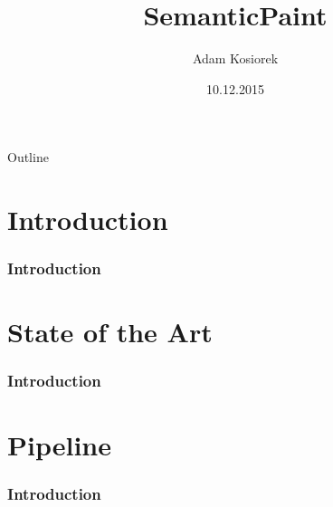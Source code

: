 \documentclass[mathserif, 8pt]{beamer}
\title[short title]{SemanticPaint}
\author[short presentator]{Adam Kosiorek}
\institute[CAMP]{Computer Aided Medical Procedures \\
Technische Universit\"at M\"unchen}
\date[]{10.12.2015}
\begin{document}
%   
%   
% 
%   
%   
%   


\begin{frame}
\titlepage
\end{frame}


\begin{frame}{Outline}
\tableofcontents
\end{frame}


\section{Introduction}
\begin{frame}
\frametitle{Introduction}

\end{frame}

\section{State of the Art}
\begin{frame}
\frametitle{Introduction}

\end{frame}

\section{Pipeline}
\begin{frame}
\frametitle{Introduction}

\end{frame}
\end{document}
